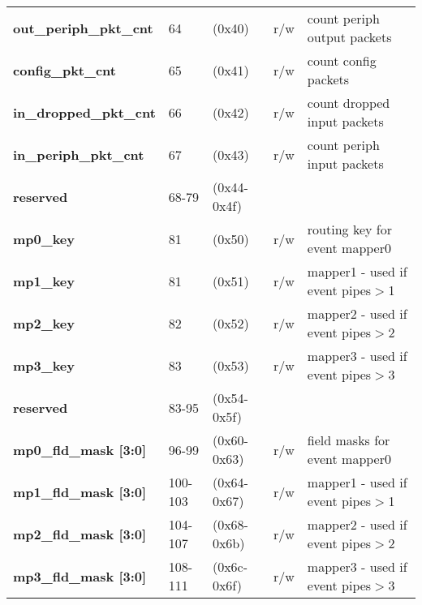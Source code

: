 \documentclass[11pt,a4paper,twoside]{article}
\begin{document}
\begin{center}
\begin{table}[!h]
\begin{tabularx}{\textwidth}{| p{36mm} p{13mm} p{21mm} p{7mm} X |}
		\textbf{out\_periph\_pkt\_cnt}       & 64                         & (0x40)                         & r/w                 & count periph output packets\\%
		\textbf{config\_pkt\_cnt}            & 65                         & (0x41)                         & r/w                 & count config packets \\%
		\textbf{in\_dropped\_pkt\_cnt}       & 66                         & (0x42)                         & r/w                 & count dropped input packets \\%
		\textbf{in\_periph\_pkt\_cnt}        & 67                         & (0x43)                         & r/w                 & count periph input packets\\%
		\cellcolor{gray!25}\textbf{reserved} & \cellcolor{gray!25}68-79   & \cellcolor{gray!25}(0x44-0x4f) & \cellcolor{gray!25} & \cellcolor{gray!25}\\%
		\textbf{mp0\_key}                    & 81                         & (0x50)                         & r/w                 & routing key for event mapper0 \\%
		\textbf{mp1\_key}                    & 81                         & (0x51)                         & r/w                 & mapper1 - used if event pipes$>$1 \\%
		\textbf{mp2\_key}                    & 82                         & (0x52)                         & r/w                 & mapper2 - used if event pipes$>$2 \\%
		\textbf{mp3\_key}                    & 83                         & (0x53)                         & r/w                 & mapper3 - used if event pipes$>$3 \\%
		\cellcolor{gray!25}\textbf{reserved} & \cellcolor{gray!25}83-95   & \cellcolor{gray!25}(0x54-0x5f) & \cellcolor{gray!25} & \cellcolor{gray!25}\\%
		\textbf{mp0\_fld\_mask [3:0]}        & 96-99                      & (0x60-0x63)                    & r/w                 & field masks for event mapper0 \\%
		\textbf{mp1\_fld\_mask [3:0]}        & 100-103                    & (0x64-0x67)                    & r/w                 & mapper1 - used if event pipes$>$1 \\%
		\textbf{mp2\_fld\_mask [3:0]}        & 104-107                    & (0x68-0x6b)                    & r/w                 & mapper2 - used if event pipes$>$2 \\%
		\textbf{mp3\_fld\_mask [3:0]}        & 108-111                    & (0x6c-0x6f)                    & r/w                 & mapper3 - used if event pipes$>$3 \\%

\end{tabularx}
\end{table}
\end{center}
\end{document}

